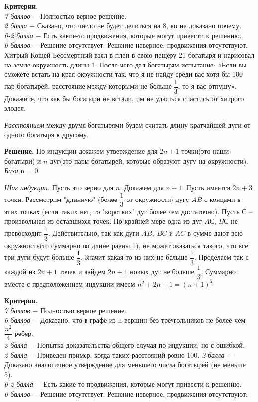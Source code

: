 \textbf{Критерии.} \\
\textit{7 баллов} $-$ Полностью верное решение. \\
\textit{2 балла} $-$ Сказано, что число не будет делиться на 8, но не доказано почему. \\
\textit{0-2 балла} $-$ Есть какие-то продвижения, которые могут привести к решению. \\ 
\textit{0 баллов} $-$ Решение отсутствует. Решение неверное, продвижения отсутствуют. \\ 

 Хитрый Кощей Бессмертный взял в плен в свою пещеру 21 богатыря и нарисовал на земле окружность длины 1. После чего дал богатырям испытание: «Если вы сможете встать на края окружности так, что я не найду среди вас хотя бы 100 пар богатырей, расстояние между которыми не больше $\dfrac{1}{3}$, то я вас отпущу». Докажите, что как бы богатыри не встали, им не удасться спастись от хитрого злодея. 
\par
\textit{Расстоянием} между двумя богатырями будем считать длину кратчайшей дуги от одного богатыря к другому.

\textbf{Решение.} По индукции докажем утверждение для  $2n + 1$  точки(это наши богатыри) и $n$ дуг(это пары богатырей, которые образуют дугу на окружности). \textit{База}  n = 0.
\par 
\textit{Шаг индукции.} Пусть это верно для $n$. Докажем для $n+1$. Пусть имеется  $2n + 3$  точки. Рассмотрим "длинную" (более $\dfrac{1}{3}$ от окружности) дугу $AB$ с концами в этих точках (если таких нет, то "коротких" дуг более чем достаточно). Пусть $С$ – произвольная из оставшихся точек. По крайней мере одна из дуг $AС$, $BС$ не превосходит $\dfrac{1}{3}$. Действительно, так как дуги $AB, \ BC$ и $AC$ в сумме дают всю окружность(то суммарно по длине равны 1), не может оказаться такого, что все три дуги будут больше $\dfrac{1}{3}$. Значит какая-то из них не больше $\dfrac{1}{3}$. Проделаем так с каждой из $2n+1$ точек и найдем $2n+1$ новых дуг не больше $\dfrac{1}{3}$. Суммарно вместе с предположением индукции имеем $n^2 + 2n + 1 = (n+1)^2$

\textbf{Критерии.} \\
\textit{7 баллов} $-$ Полностью верное решение. \\
\textit{6 баллов} $-$ Доказано, что в графе из n вершин без треугольников не более чем $\dfrac{n^{2}}{4}$ ребер. \\ 
\textit{3 балла} $-$ Попытка доказательства общего случая по индукции, но с ошибкой. \\ 
\textit{2 балла} $-$ Приведен пример, когда таких расстояний ровно 100.\newpage
\textit{2 балла} $-$ Доказано аналогичное утверждение для меньшего числа богатырей (не меньше 5). \\
\textit{0-2 балла} $-$ Есть какие-то продвижения, которые могут привести к решению. \\ 
\textit{0 баллов} $-$ Решение отсутствует. Решение неверное, продвижения отсутствуют. \\ 
